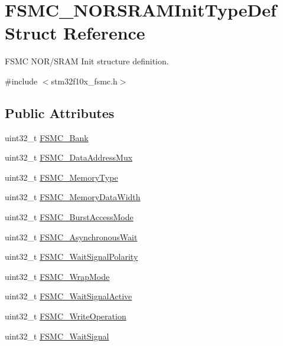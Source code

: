 \hypertarget{structFSMC__NORSRAMInitTypeDef}{
\section{FSMC\_\-NORSRAMInitTypeDef Struct Reference}
\label{structFSMC__NORSRAMInitTypeDef}
}


FSMC NOR/SRAM Init structure definition.  




{\ttfamily \#include $<$stm32f10x\_\-fsmc.h$>$}

\subsection*{Public Attributes}
\begin{DoxyCompactItemize}
\item 
uint32\_\-t \hyperlink{structFSMC__NORSRAMInitTypeDef_a7fcd864461cf0d1cf83b62fa2b4d3f86}{FSMC\_\-Bank}
\item 
uint32\_\-t \hyperlink{structFSMC__NORSRAMInitTypeDef_af4ff95085d3bb39e34c2f88ca3140ce5}{FSMC\_\-DataAddressMux}
\item 
uint32\_\-t \hyperlink{structFSMC__NORSRAMInitTypeDef_a979ad605c6a63923e060576ee01e888d}{FSMC\_\-MemoryType}
\item 
uint32\_\-t \hyperlink{structFSMC__NORSRAMInitTypeDef_a1791c771ff86f5dc5422040409517e9d}{FSMC\_\-MemoryDataWidth}
\item 
uint32\_\-t \hyperlink{structFSMC__NORSRAMInitTypeDef_aec0bfff5c934c251c21450a50f5bdb79}{FSMC\_\-BurstAccessMode}
\item 
uint32\_\-t \hyperlink{structFSMC__NORSRAMInitTypeDef_ac350cc34377fe3d5f882a6801bab1ac9}{FSMC\_\-AsynchronousWait}
\item 
uint32\_\-t \hyperlink{structFSMC__NORSRAMInitTypeDef_a5d4d76594fc201943b51095e3ef34791}{FSMC\_\-WaitSignalPolarity}
\item 
uint32\_\-t \hyperlink{structFSMC__NORSRAMInitTypeDef_a7e201c17bf7c5f6cc69fb6de29c8b024}{FSMC\_\-WrapMode}
\item 
uint32\_\-t \hyperlink{structFSMC__NORSRAMInitTypeDef_a71c6e7cc8e7e1a8fd0562960ffd23e88}{FSMC\_\-WaitSignalActive}
\item 
uint32\_\-t \hyperlink{structFSMC__NORSRAMInitTypeDef_a596793d1735c4e38c87e3bf91d986370}{FSMC\_\-WriteOperation}
\item 
uint32\_\-t \hyperlink{structFSMC__NORSRAMInitTypeDef_aedbc7df3ff61cc93a910a64dc53c932b}{FSMC\_\-WaitSignal}

\end{DoxyCompactItemize}
